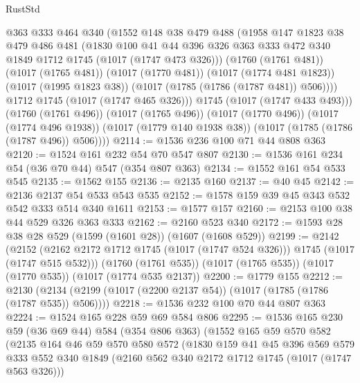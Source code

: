 \begin{lexlean}{RustStd}
\begin{coremodule}
            @363
            @333
            @464
            @340
            (@1552
              @148
              @38
              @479
              @488
              (@1958
                @147
                @1823
                @38
                @479
                @486
                @481
                (@1830
                  @100
                  @41
                  @44
                  @396
                  @326
                  @363
                  @333
                  @472
                  @340
                  @1849
                  @1712
                  @1745
                  (@1017 (@1747 @473 @326)))
                (@1760 (@1761 @481))
                (@1017 (@1765 @481))
                (@1017 (@1770 @481))
                (@1017 (@1774 @481 @1823))
                (@1017 (@1995 @1823 @38))
                (@1017 (@1785 (@1786 (@1787 @481)) @506))))
            @1712
            @1745
            (@1017 (@1747 @465 @326)))
          @1745
          (@1017 (@1747 @433 @493)))
        (@1760 (@1761 @496))
        (@1017 (@1765 @496))
        (@1017 (@1770 @496))
        (@1017 (@1774 @496 @1938))
        (@1017 (@1779 @140 @1938 @38))
        (@1017 (@1785 (@1786 (@1787 @496)) @506))))
@2114 := @1536 @236 @100 @71 @44 @808 @363
@2120 := @1524 @161 @232 @54 @70 @547 @807
@2130 := @1536 @161 @234 @54 (@36 @70 @44) @547 (@354 @807 @363)
@2134 := @1552 @161 @54 @533 @545
@2135 := @1562 @155
@2136 := @2135 @160
@2137 := @40 @45
@2142 := @2136 @2137 @54 @533 @543 @535
@2152 := @1578 @159 @39 @45 @343 @532 @542 @333 @514 @340 @1611
@2153 := @1577 @157
@2160 := @2153 @100 @38 @44 @529 @326 @363 @333
@2162 := @2160 @523 @340
@2172 := @1593 @28 @38 @28 @529 (@1599 (@1601 @28)) (@1607 (@1608 @529))
@2199 := @2142
    (@2152 (@2162 @2172 @1712 @1745 (@1017 (@1747 @524 @326))) @1745 (@1017 (@1747 @515 @532)))
    (@1760 (@1761 @535))
    (@1017 (@1765 @535))
    (@1017 (@1770 @535))
    (@1017 (@1774 @535 @2137))
@2200 := @1779 @155
@2212 := @2130 (@2134 (@2199 (@1017 (@2200 @2137 @54)) (@1017 (@1785 (@1786 (@1787 @535)) @506))))
@2218 := @1536 @232 @100 @70 @44 @807 @363
@2224 := @1524 @165 @228 @59 @69 @584 @806
@2295 := @1536
    @165
    @230
    @59
    (@36 @69 @44)
    @584
    (@354 @806 @363)
    (@1552
      @165
      @59
      @570
      @582
      (@2135
        @164
        @46
        @59
        @570
        @580
        @572
        (@1830
          @159
          @41
          @45
          @396
          @569
          @579
          @333
          @552
          @340
          @1849
          (@2160 @562 @340 @2172 @1712 @1745 (@1017 (@1747 @563 @326)))

\end{coremodule}
\end{lexlean}
